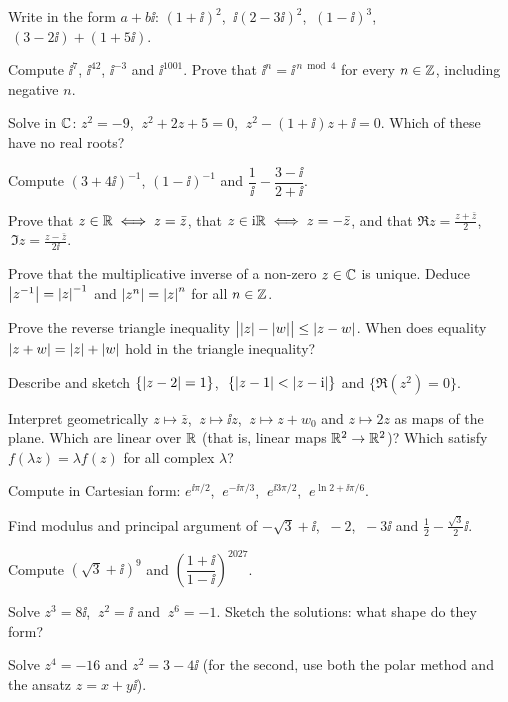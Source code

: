 \begin{exerciseset}
   Write in the form $a+b\ii$: $(1+\ii)^2$, $\ \ii(2-3\ii)^2$, $\ (1-\ii)^3$, $\ (3-2\ii)+(1+5\ii)$.

   Compute $\ii^{7}$, $\ii^{42}$, $\ii^{-3}$ and $\ii^{1001}$. Prove that $\ii^n=\ii^{\,n \bmod 4}$ for every $n\in\mathbb{Z}$, including negative $n$.

   Solve in $\mathbb{C}$: $z^2=-9$, $\ z^2+2z+5=0$, $\ z^2-(1+\ii)z+\ii=0$. Which of these have no real roots?

   Compute $(3+4\ii)^{-1}$, $(1-\ii)^{-1}$ and $\dfrac{1}{\ii}-\dfrac{3-\ii}{2+\ii}$.

   Prove that $z\in\mathbb{R}\iff z=\bar z$, that $z\in\mathrm{i}\mathbb{R}\iff z=-\bar z$, and that $\Re z=\frac{z+\bar z}{2}$, $\ \Im z=\frac{z-\bar z}{2\ii}$.

   Prove that the multiplicative inverse of a non-zero $z\in\mathbb{C}$ is unique. Deduce $\left|z^{-1}\right|=\left|z\right|^{-1}$ and $\left|z^n\right|=\left|z\right|^n$ for all $n\in\mathbb{Z}$.

   Prove the reverse triangle inequality $\bigl|\left|z\right|-\left|w\right|\bigr|\le\left|z-w\right|$. When does equality $\left|z+w\right|=\left|z\right|+\left|w\right|$ hold in the triangle inequality?

   Describe and sketch $\{\left|z-2\right|=1\}$, $\ \{\left|z-1\right|<\left|z-\mathrm{i}\right|\}$ and $\{\Re(z^2)=0\}$.

   Interpret geometrically $z\mapsto\bar z$, $\ z\mapsto\ii z$, $\ z\mapsto z+w_0$ and $z\mapsto 2z$ as maps of the plane. Which are linear over $\mathbb{R}$ (that is, linear maps $\mathbb{R}^2\to\mathbb{R}^2$)? Which satisfy $f(\lambda z)=\lambda f(z)$ for all complex $\lambda$?

   Compute in Cartesian form: $e^{\ii\pi/2}$, $\ e^{-\ii\pi/3}$, $\ e^{\ii 3\pi/2}$, $\ e^{\ln 2+\ii\pi/6}$.

   Find modulus and principal argument of $-\sqrt3+\ii$, $\ -2$, $\ -3\ii$ and $\tfrac12-\tfrac{\sqrt3}{2}\ii$.

   Compute $(\sqrt3+\ii)^9$ and $\left(\dfrac{1+\ii}{1-\ii}\right)^{2027}$.

   Solve $z^3=8\ii$, $\ z^2=\ii$ and $\ z^6=-1$. Sketch the solutions: what shape do they form?

   Solve $z^4=-16$ and $z^2=3-4\ii$ (for the second, use both the polar method and the ansatz $z=x+y\ii$).


\end{exerciseset}
